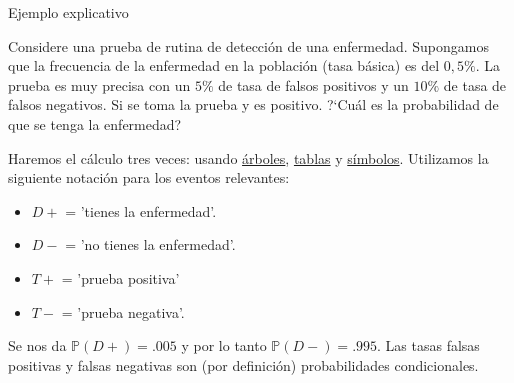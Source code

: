 \documentclass[10pt]{beamer}
\begin{document}
\begin{frame}{Ejemplo explicativo}
\small{Considere una prueba de rutina de detecci\'on de una enfermedad. Supongamos que la frecuencia de la enfermedad en la población (tasa b\'asica) es del $0,5\%$. La prueba es muy precisa con un $5\%$ de tasa de falsos positivos y un $10\%$ de tasa de falsos negativos. Si se  toma la prueba y es  positivo. ?`Cu\'al es la probabilidad de que se tenga la enfermedad?
	
Haremos el c\'alculo tres veces: usando \underline{\'arboles}, \underline{tablas} y \underline{s\'imbolos}. Utilizamos la siguiente notaci\'on para los eventos relevantes:

\begin{itemize}
\item $D+$ = 'tienes la enfermedad'.
\item $D-$ = 'no tienes la enfermedad'.
\item $T+$ = 'prueba positiva'
\item $T-$ = 'prueba negativa'.
\end{itemize}

Se nos da $\mathbb{P}(D +) = .005$ y por lo tanto $\mathbb{P}(D-) = .995$. Las tasas falsas positivas y falsas negativas son (por definici\'on) probabilidades condicionales.
}
\end{frame}
\end{document}

